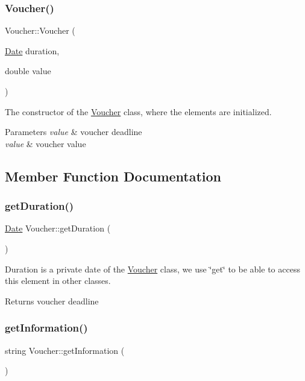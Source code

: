 \subsubsection{\texorpdfstring{Voucher()}{Voucher()}}
{\footnotesize\ttfamily Voucher\+::\+Voucher (\begin{DoxyParamCaption}\item[{\hyperlink{classDate}{Date}}]{duration,  }\item[{double}]{value }\end{DoxyParamCaption})}

The constructor of the \hyperlink{classVoucher}{Voucher} class, where the elements are initialized. 
\begin{DoxyParams}{Parameters}
{\em value} & voucher deadline \\
\hline
{\em value} & voucher value \\
\hline
\end{DoxyParams}


\subsection{Member Function Documentation}
\hypertarget{classVoucher_a661d91c985c89f3cb9231db52c45a8f1}{}\label{classVoucher_a661d91c985c89f3cb9231db52c45a8f1} 
\subsubsection{\texorpdfstring{get\+Duration()}{getDuration()}}
{\footnotesize\ttfamily \hyperlink{classDate}{Date} Voucher\+::get\+Duration (\begin{DoxyParamCaption}{ }\end{DoxyParamCaption})}

Duration is a private date of the \hyperlink{classVoucher}{Voucher} class, we use \char`\"{}get\char`\"{} to be able to access this element in other classes. \begin{DoxyReturn}{Returns}
voucher deadline 
\end{DoxyReturn}
\hypertarget{classVoucher_a3fbbf6a661b7542fa1012bb287d564d8}{}\label{classVoucher_a3fbbf6a661b7542fa1012bb287d564d8} 
\subsubsection{\texorpdfstring{get\+Information()}{getInformation()}}
{\footnotesize\ttfamily string Voucher\+::get\+Information (\begin{DoxyParamCaption}{ }\end{DoxyParamCaption})}

